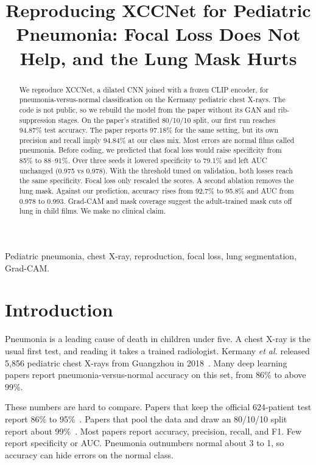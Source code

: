 \documentclass[conference]{IEEEtran}
\begin{document}
\title{Reproducing XCCNet for Pediatric Pneumonia: Focal Loss Does Not Help, and the Lung Mask Hurts}
\author{}
\maketitle

\begin{abstract}
We reproduce XCCNet, a dilated CNN joined with a frozen CLIP encoder, for pneumonia-versus-normal classification on the Kermany pediatric chest X-rays. The code is not public, so we rebuild the model from the paper without its GAN and rib-suppression stages. On the paper's stratified 80/10/10 split, our first run reaches 94.87\% test accuracy. The paper reports 97.18\% for the same setting, but its own precision and recall imply 94.84\% at our class mix. Most errors are normal films called pneumonia. Before coding, we predicted that focal loss would raise specificity from 85\% to 88--91\%. Over three seeds it lowered specificity to 79.1\% and left AUC unchanged (0.975 vs 0.978). With the threshold tuned on validation, both losses reach the same specificity. Focal loss only rescaled the scores. A second ablation removes the lung mask. Against our prediction, accuracy rises from 92.7\% to 95.8\% and AUC from 0.978 to 0.993. Grad-CAM and mask coverage suggest the adult-trained mask cuts off lung in child films. We make no clinical claim.
\end{abstract}
\begin{IEEEkeywords}
Pediatric pneumonia, chest X-ray, reproduction, focal loss, lung segmentation, Grad-CAM.
\end{IEEEkeywords}

\section{Introduction}
Pneumonia is a leading cause of death in children under five. A chest X-ray is the usual first test, and reading it takes a trained radiologist. Kermany \textit{et al.} released 5{,}856 pediatric chest X-rays from Guangzhou in 2018~\cite{kermany2018}. Many deep learning papers report pneumonia-versus-normal accuracy on this set, from 86\% to above 99\%.

These numbers are hard to compare. Papers that keep the official 624-patient test report 86\% to 95\%~\cite{kermany2018,rajaraman2018,salehi2021,ayan2021}. Papers that pool the data and draw an 80/10/10 split report about 99\%~\cite{raghaw2024,choudhury2026}. Most papers report accuracy, precision, recall, and F1. Few report specificity or AUC. Pneumonia outnumbers normal about 3 to 1, so accuracy can hide errors on the normal class.
\end{document}
